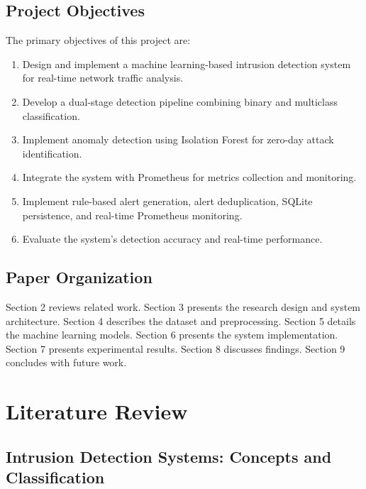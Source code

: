 \documentclass[12pt,a4paper]{article}
\begin{document}
\subsection{Project Objectives}

The primary objectives of this project are:

\begin{enumerate}[label=\arabic*.]
    \item Design and implement a machine learning-based intrusion detection system for real-time network traffic analysis.
    \item Develop a dual-stage detection pipeline combining binary and multiclass classification.
    \item Implement anomaly detection using Isolation Forest for zero-day attack identification.
    \item Integrate the system with Prometheus for metrics collection and monitoring.
    \item Implement rule-based alert generation, alert deduplication, SQLite persistence, and real-time Prometheus monitoring.
    \item Evaluate the system's detection accuracy and real-time performance.
\end{enumerate}

\subsection{Paper Organization}

Section 2 reviews related work. Section 3 presents the research design and system architecture. Section 4 describes the dataset and preprocessing. Section 5 details the machine learning models. Section 6 presents the system implementation. Section 7 presents experimental results. Section 8 discusses findings. Section 9 concludes with future work.

\section{Literature Review}

\subsection{Intrusion Detection Systems: Concepts and Classification}
\end{document}
